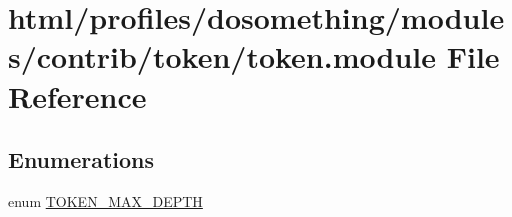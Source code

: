 \hypertarget{token_8module}{
\section{html/profiles/dosomething/modules/contrib/token/token.module File Reference}
\label{token_8module}
}
\subsection*{Enumerations}
\begin{DoxyCompactItemize}
\item 
enum \hyperlink{token_8module_aeee6a9ddcb3b88d686109d24df779b49}{TOKEN\_\-MAX\_\-DEPTH} 
\end{DoxyCompactItemize}
